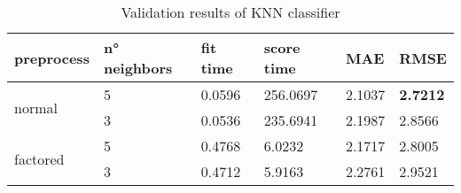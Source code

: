 \begin{table}[H]
    \centering
    \begin{tabular}{l|lllll}
    \toprule
    \textbf{preprocess} & \textbf{n° neighbors} & \textbf{fit time} & \textbf{score time} & \textbf{MAE} & \textbf{RMSE} \\ \midrule
    \multirow{2}{*}{normal}     & 5 & 0.0596 & 256.0697 & 2.1037 & \textbf{2.7212} \\
                                & 3 & 0.0536 & 235.6941 & 2.1987 & 2.8566          \\
                                \midrule
    \multirow{2}{*}{factored}   & 5 & 0.4768 & 6.0232   & 2.1717 & 2.8005          \\
                                & 3 & 0.4712 & 5.9163   & 2.2761 & 2.9521          \\
    \bottomrule     
    \end{tabular}
    \caption{Validation results of KNN classifier}
    \label{tab:val_knn}
    \end{table}